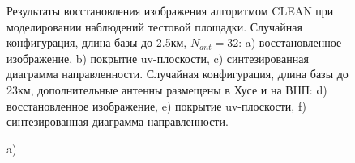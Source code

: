 \documentclass[10pt,a4paper]{article}
\begin{document}
\begin{figure}
\caption{Результаты восстановления изображения алгоритмом CLEAN при моделировании наблюдений тестовой площадки. Случайная конфигурация, длина базы до 2.5км, $N_{ant}=32$: a) восстановленное изображение, b) покрытие uv-плоскости, c) синтезированная диаграмма направленности. Случайная конфигурация, длина базы до 23км, дополнительные антенны размещены в Хусе и на ВНП: d) восстановленное изображение, e) покрытие uv-плоскости, f) синтезированная диаграмма направленности.}
\label{fig:RIF32-rand_n32}
\end{figure}

\begin{figure} %
\begin{minipage}[h]{0.47\linewidth}
 a) \\
\end{minipage}
\hfill
\begin{minipage}[h]{0.47\linewidth}

\end{minipage}
\end{figure}
\end{document}
